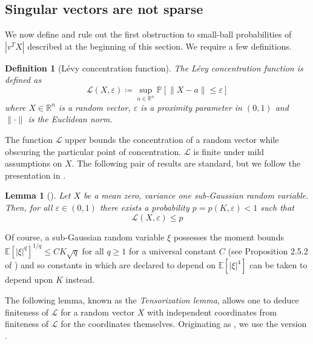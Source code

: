 \documentclass[11pt]{article}
\numberwithin{equation}{section}
\newtheorem{lemma}[theorem]{Lemma}
\newtheorem{definition}[theorem]{Definition}
\theoremstyle{remark}
\newcommand{\R}{\mathbb{R}}
\newcommand{\E}{\mathbb{E}}
\newcommand{\LevyFunc}{\mathcal{L}}
\begin{document}
\subsection{Singular vectors are not sparse}\label{sec-incompressible}
We now define and rule out the first obstruction to small-ball probabilities of $|v^T X|$ described at the beginning of this section. We require a few definitions.

\begin{definition}[L\'evy concentration function]\label{def-levy-concentration-func}
    The L\'evy concentration function is defined as 
    \begin{equation*}
        \LevyFunc(X, \varepsilon) \coloneqq \sup_{a \in \R^n}\mathbb{P}[\|X - a\| \leq \varepsilon]
    \end{equation*}
    where $X \in \R^n$ is a random vector, $\varepsilon$ is a proximity parameter in $(0, 1)$ and $\| \cdot \|$ is the Euclidean norm.
\end{definition}

The function $\LevyFunc$ upper bounds the concentration of a random vector while obscuring the particular point of concentration. $\LevyFunc$ is finite under mild assumptions on $X$. The following pair of results are standard, but we follow the presentation in \cite{christoffersen2025gaps}.

\begin{lemma}[{\cite[Lemma 2.1]{christoffersen2025gaps}}]\label{lem-levy-concentration-finiteness}
    Let $X$ be a mean zero, variance one sub-Gaussian random variable. Then, for all $\varepsilon \in (0, 1)$ there exists a probability $p = p(K, \varepsilon) < 1$ such that
    \begin{equation*}
        \LevyFunc(X, \varepsilon) \leq p
    \end{equation*}
\end{lemma}

Of course, a sub-Gaussian random variable $\xi$ possesses the moment bounds $\E[|\xi|^q]^{1/q} \leq CK\sqrt{q}$ for all $q \geq 1$ for a universal constant $C$ (see Proposition 2.5.2 of \cite{vershynin2018high}) and so constants in \cite{christoffersen2025gaps} which are declared to depend on $\E[|\xi|^4]$ can be taken to depend upon $K$ instead.

The following lemma, known as the \textit{Tensorization lemma}, allows one to deduce finiteness of $\LevyFunc$ for a random vector $X$ with independent coordinates from finiteness of $\LevyFunc$ for the coordinates themselves. Originating as \cite[Lemma 3.4]{vershynin2014invertibility}, we use the version \cite[Lemma 2.2]{christoffersen2025gaps}.
\end{document}
